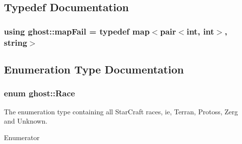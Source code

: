 \subsection{Typedef Documentation}
\hypertarget{namespaceghost_af44c393431f46e255b1c303cd50854b8}{
\subsubsection[{map\-Fail}]{\setlength{\rightskip}{0pt plus 5cm}using {\bf ghost\-::map\-Fail} = typedef map$<$pair$<$int, int$>$, string$>$}}\label{namespaceghost_af44c393431f46e255b1c303cd50854b8}


\subsection{Enumeration Type Documentation}
\hypertarget{namespaceghost_a8b1db75c40c6980adcf244ddccc0324b}{
\subsubsection[{Race}]{\setlength{\rightskip}{0pt plus 5cm}enum {\bf ghost\-::\-Race}}}\label{namespaceghost_a8b1db75c40c6980adcf244ddccc0324b}
The enumeration type containing all Star\-Craft races, ie, Terran, Protoss, Zerg and Unknown. \begin{Desc}
\item[Enumerator]\par
\begin{description}
\item[{\em 
\hypertarget{namespaceghost_a8b1db75c40c6980adcf244ddccc0324ba83c1a2af1bdced3b37d96f507dea0ea4}{Terran}\label{namespaceghost_a8b1db75c40c6980adcf244ddccc0324ba83c1a2af1bdced3b37d96f507dea0ea4}
}]\item[{\em 
\hypertarget{namespaceghost_a8b1db75c40c6980adcf244ddccc0324ba380e68da58f712ae9a02ded67517f6e5}{Protoss}\label{namespaceghost_a8b1db75c40c6980adcf244ddccc0324ba380e68da58f712ae9a02ded67517f6e5}
}]\item[{\em 
\hypertarget{namespaceghost_a8b1db75c40c6980adcf244ddccc0324ba95a952d94cc72ad754bcb37b1e16c221}{Zerg}\label{namespaceghost_a8b1db75c40c6980adcf244ddccc0324ba95a952d94cc72ad754bcb37b1e16c221}
}]\item[{\em 
\hypertarget{namespaceghost_a8b1db75c40c6980adcf244ddccc0324ba900f1a9a96acbc80f0a573a909a21b01}{Unknown}\label{namespaceghost_a8b1db75c40c6980adcf244ddccc0324ba900f1a9a96acbc80f0a573a909a21b01}
}]\end{description}
\end{Desc}


